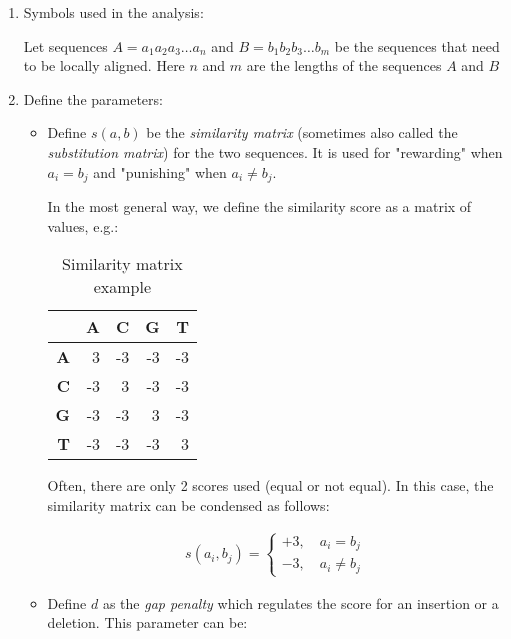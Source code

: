 \begin{enumerate}
	\item Symbols used in the analysis:
	
	Let sequences $A = a_1 a_2 a_3 \dots a_n$ and $B = b_1 b_2 b_3 \dots b_m$ be the sequences that need to be locally aligned. Here $n$ and $m$ are the lengths of the sequences $A$ and $B$
	
	\item Define the parameters: 
	
	\begin{itemize}
		\item Define $s(a,b)$ be the \emph{similarity matrix} (sometimes also called the \emph{substitution matrix}) for the two sequences. It is used for "rewarding" when $a_i = b_j$ and "punishing" when $a_i \neq b_j$.
		
		In the most general way, we define the similarity score as a matrix of values, e.g.:
		
		\begin{table}[H]
			\centering
			\begin{tabular}{|r|r|r|r|r|}
				\hline
				& \textbf{A} & \textbf{C} & \textbf{G} & \textbf{T} \\ \hline
				\textbf{A} & 3          & -3         & -3         & -3         \\ \hline
				\textbf{C} & -3         & 3          & -3         & -3         \\ \hline
				\textbf{G} & -3         & -3         & 3          & -3         \\ \hline
				\textbf{T} & -3         & -3         & -3         & 3          \\ \hline
			\end{tabular}
			
			\caption{\centering Similarity matrix example}
		\end{table}
		
		Often, there are only 2 scores used (equal or not equal). In this case, the similarity matrix can be condensed as follows:
		
		\begin{align*}
		s(a_i,b_j)=
		\begin{cases}
		+3, \quad a_i=b_j     \\
		-3, \quad a_i\neq b_j
		\end{cases}
		\end{align*}
		
		\item Define $d$ as the \emph{gap penalty} which regulates the score for an insertion or a deletion. This parameter can be:
		

\end{itemize}
\end{enumerate}
